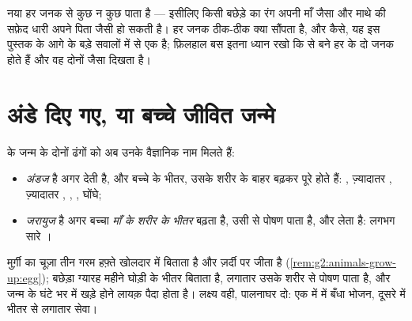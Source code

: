 \begin{remark}[दो जनक, मिली-जुली क़िस्मत]\label{rem:g4:animal-reproduction:mix}
नया  हर जनक से कुछ न कुछ पाता है --- इसीलिए किसी बछेड़े का रंग अपनी
माँ जैसा और माथे की सफ़ेद धारी अपने पिता जैसी हो सकती है। हर जनक
ठीक-ठीक क्या सौंपता है, और कैसे, यह इस पुस्तक के आगे के बड़े सवालों
में से एक है; फ़िलहाल बस इतना ध्यान रखो कि  से बने हर 
के दो जनक होते हैं और वह दोनों जैसा दिखता है।
\end{remark}

\section{अंडे दिए गए, या बच्चे जीवित जन्मे}

\begin{definition}[अंडज और जरायुज]\label{def:g4:animal-reproduction:ovivivi}
 के जन्म के दोनों ढंगों को अब उनके
वैज्ञानिक नाम मिलते हैं:
\begin{itemize}
  \item {} \emph{अंडज} है अगर  \emph{} देती है,
        और बच्चे  के भीतर, उसके शरीर के बाहर बढ़कर पूरे होते हैं:
        , ज़्यादातर , ज़्यादातर , , ,
        घोंघे;
  \item {} \emph{जरायुज} है अगर बच्चा \emph{माँ के
        शरीर के भीतर} बढ़ता है, उसी से पोषण पाता है, और
        \emph{} लेता है: लगभग सारे ।
\end{itemize}
\end{definition}

\begin{example}[दो पालनाघर]\label{ex:g4:animal-reproduction:nurseries}
मुर्ग़ी का चूज़ा तीन गरम हफ़्ते खोलदार  में बिताता है और ज़र्दी पर
जीता है (\cref{rem:g2:animals-grow-up:egg}); बछेड़ा ग्यारह महीने घोड़ी
के भीतर बिताता है, लगातार उसके शरीर से पोषण पाता है, और जन्म के घंटे
भर में खड़े होने लायक़ पैदा होता है। लक्ष्य वही, पालनाघर दो: एक में
 में बँधा भोजन, दूसरे में भीतर से लगातार सेवा।
\end{example}

